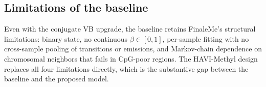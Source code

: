 \subsection*{Limitations of the baseline}
Even with the conjugate VB upgrade, the baseline retains FinaleMe's structural limitations: binary state, no continuous $\beta\in[0,1]$, per-sample fitting with no cross-sample pooling of transitions or emissions, and Markov-chain dependence on chromosomal neighbors that fails in CpG-poor regions. The HAVI-Methyl design replaces all four limitations directly, which is the substantive gap between the baseline and the proposed model.
